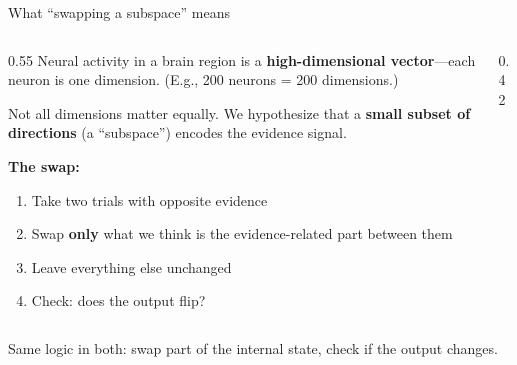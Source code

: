\documentclass[aspectratio=169,11pt]{beamer}
\begin{document}
\begin{frame}{What ``swapping a subspace'' means}
\begin{columns}[T]
\begin{column}{0.55\textwidth}
{\small Neural activity in a brain region is a \textbf{high-dimensional vector}---each neuron is one dimension. (E.g., 200 neurons = 200 dimensions.)}

\vspace{0.3em}
{\small Not all dimensions matter equally. We hypothesize that a \textbf{small subset of directions} (a ``subspace'') encodes the evidence signal.}

\vspace{0.3em}
{\small \textbf{The swap:}}
\begin{enumerate}\setlength\itemsep{2pt}
  \item {\small Take two trials with opposite evidence}
  \item {\small Swap \textbf{only} what we think is the evidence-related part between them}
  \item {\small Leave everything else unchanged}
  \item {\small Check: does the output flip?}
\end{enumerate}

\end{column}
\begin{column}{0.42\textwidth}
\centering
{}
\end{column}
\end{columns}

\vspace{0.3em}
{\small Same logic in both: swap part of the internal state, check if the output changes.}
\end{frame}
\end{document}
